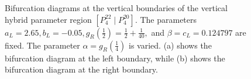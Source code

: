 \begin{figure}
	\centering
	\caption[Bifurcation diagrams for the vertical hybrid parameter regions in the increasing archetypal model]{
		Bifurcation diagrams at the vertical boundaries of the vertical hybrid parameter region $\left[P^{22}_4 \mid P^{20}_4\right]$.
		The parameters $a_L = 2.65, b_L = -0.05, g_R\left(\frac{1}{2}\right) = \frac{1}{2} + \frac{1}{40},$ and $\beta = c_L = 0.124797$ are fixed.
		The parameter $\alpha = g_R\left(\frac{1}{4}\right)$ is varied.
		(a) shows the bifurcation diagram at the left boundary, while (b) shows the bifurcation diagram at the right boundary.
	}
	\label{fig:add.appa.vert.bif}
\end{figure}
